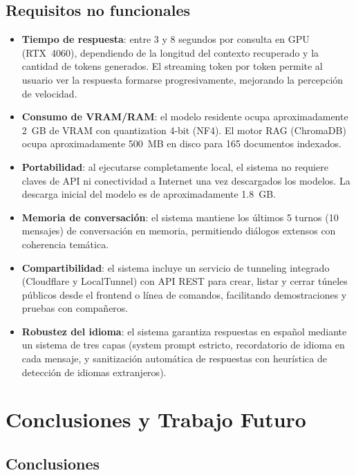 \subsection{Requisitos no funcionales}

\begin{itemize}
    \item \textbf{Tiempo de respuesta}: entre 3 y 8 segundos por consulta en GPU (RTX~4060), dependiendo de la longitud del contexto recuperado y la cantidad de tokens generados. El streaming token por token permite al usuario ver la respuesta formarse progresivamente, mejorando la percepción de velocidad.
    \item \textbf{Consumo de VRAM/RAM}: el modelo residente ocupa aproximadamente 2~GB de VRAM con quantization 4-bit (NF4). El motor RAG (ChromaDB) ocupa aproximadamente 500~MB en disco para 165 documentos indexados.
    \item \textbf{Portabilidad}: al ejecutarse completamente local, el sistema no requiere claves de API ni conectividad a Internet una vez descargados los modelos. La descarga inicial del modelo es de aproximadamente 1.8~GB.
    \item \textbf{Memoria de conversación}: el sistema mantiene los últimos 5 turnos (10 mensajes) de conversación en memoria, permitiendo diálogos extensos con coherencia temática.
    \item \textbf{Compartibilidad}: el sistema incluye un servicio de tunneling integrado (Cloudflare y LocalTunnel) con API REST para crear, listar y cerrar túneles públicos desde el frontend o línea de comandos, facilitando demostraciones y pruebas con compañeros.
    \item \textbf{Robustez del idioma}: el sistema garantiza respuestas en español mediante un sistema de tres capas (system prompt estricto, recordatorio de idioma en cada mensaje, y sanitización automática de respuestas con heurística de detección de idiomas extranjeros).
\end{itemize}


\section{Conclusiones y Trabajo Futuro}
\label{sec:conclusiones}

\subsection{Conclusiones}

